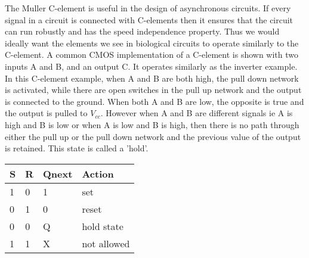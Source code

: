 \documentclass{article}
\begin{document}
The Muller C-element is useful in the design of asynchronous circuits.  If every signal in a circuit is connected with C-elements then it ensures that the circuit can run robustly and has the speed independence property.  Thus we would ideally want the elements we see in biological circuits to operate similarly to the C-element.  A common CMOS implementation of a C-element is shown with two inputs A and B, and an output C.  It operates similarly as the inverter example.  In this C-element example, when A and B are both high, the pull down network is activated, while there are open switches in the pull up network and the output is connected to the ground.  When both A and B are low, the opposite is true and the output is pulled to $V_{cc}$.  However when A and B are different signals ie A is high and B is low or when A is low and B is high, then there is no path through either the pull up or the pull down network and the previous value of the output is retained.  This state is called a 'hold'.
\newline
\begin{center}

\begin{tabular}{|p{1.5cm}|p{1.5cm}|p{1.5cm}|p{2cm}| } 
 \hline
\textbf{S} & \textbf{R} & \textbf{Qnext} & \textbf{Action} \\
\hline
1 & 0 & 1 & set \\
\hline
0 & 1 & 0 & reset \\ 
\hline
0 & 0 & Q & hold state \\ 
\hline
1 & 1 & X & not allowed\\ 
\hline
\end{tabular}

\end{center}
\end{document}
